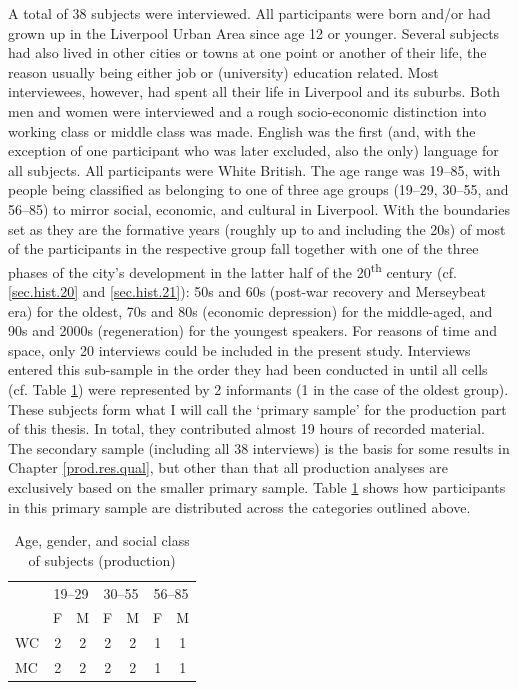 A total of 38 subjects were interviewed.
All participants were born and/or had grown up in the Liverpool Urban Area since age 12 or younger.
Several subjects had also lived in other cities or towns at one point or another of their life, the reason usually being either job or (university) education related.
Most interviewees, however, had spent all their life in Liverpool and its suburbs.
Both men and women were interviewed and a rough socio-economic distinction into working class or middle class was made.
English was the first (and, with the exception of one participant who was later excluded, also the only) language for all subjects.
All participants were White British.
The age range was 19--85, with people being classified as belonging to one of three age groups (19--29, 30--55, and 56--85) to mirror social, economic, and cultural  in Liverpool.
With the boundaries set as they are the formative years (roughly up to and including the 20s) of most of the participants in the respective group fall together with one of the three phases of the city's development in the latter half of the 20\textsuperscript{th} century (cf. \ref{sec.hist.20} and \ref{sec.hist.21}): 50s and 60s (post-war recovery and Merseybeat era) for the oldest, 70s and 80s (economic depression) for the middle-aged, and 90s and 2000s (regeneration) for the youngest speakers.
For reasons of time and space, only 20 interviews could be included in the present study.
Interviews entered this sub-sample in the order they had been conducted in until all cells (cf. Table \ref{tab.participants}) were represented by 2 informants (1 in the case of the oldest group).
These subjects form what I will call the `primary sample' for the production part of this thesis.
In total, they contributed almost 19 hours of recorded material.
The secondary sample (including all 38 interviews) is the basis for some results in Chapter \ref{prod.res.qual}, but other than that all production analyses are exclusively based on the smaller primary sample.
Table \ref{tab.participants} shows how participants in this primary sample are distributed across the categories outlined above.

	\begin{table}[h]
		\centering
		\caption{Age, gender, and social class of subjects (production)}
		\label{tab.participants}
		\begin{tabular}{lcccccc}
			\hline
			& \multicolumn{2}{c}{19--29} & \multicolumn{2}{c}{30--55} & \multicolumn{2}{c}{56--85}\\
			& F & M & F & M & F & M\\
			\hline
			WC & 2 & 2 & 2 & 2 & 1 & 1\\
			MC & 2 & 2 & 2 & 2 & 1 & 1\\
			\hline
		\end{tabular}
	\end{table}

